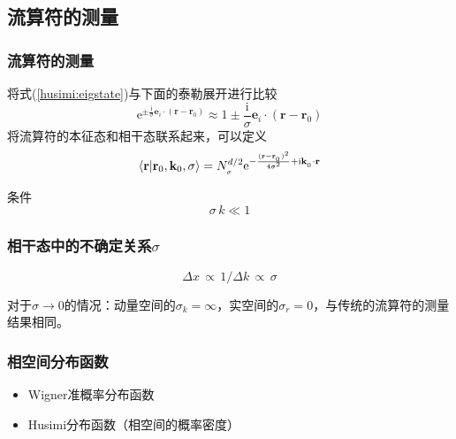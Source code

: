 \documentclass[UTF8]{beamer}
\begin{document}
\subsection{流算符的测量}
\begin{frame}
    \frametitle{流算符的测量}
    将式(\ref{husimi:eigstate})与下面的泰勒展开进行比较
    \begin{equation}
        \mathrm{e}^{\pm\frac{\mathrm{i}}{\sigma}\mathbf{e}_i\cdot(\mathbf{r}-\mathbf{r}_0)}\approx 1\pm
        \frac{\mathrm{i}}{\sigma}\mathbf{e}_i\cdot(\mathbf{r}-\mathbf{r}_0)
    \end{equation}
    将流算符的本征态和相干态联系起来，可以定义
    \begin{equation}
        \braket{\mathbf{r}|\mathbf{r}_0,\mathbf{k}_0,\sigma}=
        N_{_\sigma}^{d/2}\mathrm{e}^{-\frac{(\mathbf{r}-\mathbf{r}_{_0})^2}{4\sigma^2}+\mathrm{i}\mathbf{k}_{_0}\cdot\mathbf{r}}
    \end{equation}
    \begin{block}{条件}
        \Large
        \begin{equation*}
            \sigma\,k \ll 1
        \end{equation*}
    \end{block}
\end{frame}
\begin{frame}
    \frametitle{相干态中的不确定关系$\sigma$}
    \begin{equation}
        \Delta x \,\propto\, 1/\Delta k \,\propto\, \sigma
    \end{equation}
    \begin{block}{}
        对于$\sigma \rightarrow 0$的情况：动量空间的$\sigma_k=\infty$，实空间的$\sigma_r=0$，与传统的流算符的测量结果相同。
    \end{block}
\end{frame}
\begin{frame}
    \frametitle{相空间分布函数}
    \begin{itemize}
        \item Wigner准概率分布函数
        \item Husimi分布函数（相空间的概率密度）
    \end{itemize}
\end{frame}
\end{document}
